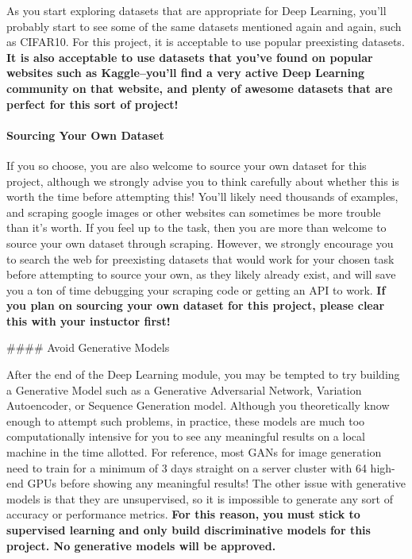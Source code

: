 \documentclass[11pt]{article}
\begin{document}
As you start exploring datasets that are appropriate for Deep Learning,
you'll probably start to see some of the same datasets mentioned again
and again, such as CIFAR10. For this project, it is acceptable to use
popular preexisting datasets. \textbf{It is also acceptable to use
datasets that you've found on popular websites such as Kaggle--you'll
find a very active Deep Learning community on that website, and plenty
of awesome datasets that are perfect for this sort of project!}

\hypertarget{sourcing-your-own-dataset}{%
\paragraph{Sourcing Your Own Dataset}\label{sourcing-your-own-dataset}}

If you so choose, you are also welcome to source your own dataset for
this project, although we strongly advise you to think carefully about
whether this is worth the time before attempting this! You'll likely
need thousands of examples, and scraping google images or other websites
can sometimes be more trouble than it's worth. If you feel up to the
task, then you are more than welcome to source your own dataset through
scraping. However, we strongly encourage you to search the web for
preexisting datasets that would work for your chosen task before
attempting to source your own, as they likely already exist, and will
save you a ton of time debugging your scraping code or getting an API to
work. \textbf{If you plan on sourcing your own dataset for this project,
please clear this with your instuctor first!}

\#\#\#\# Avoid Generative Models

After the end of the Deep Learning module, you may be tempted to try
building a Generative Model such as a Generative Adversarial Network,
Variation Autoencoder, or Sequence Generation model. Although you
theoretically know enough to attempt such problems, in practice, these
models are much too computationally intensive for you to see any
meaningful results on a local machine in the time allotted. For
reference, most GANs for image generation need to train for a minimum of
3 days straight on a server cluster with 64 high-end GPUs before showing
any meaningful results! The other issue with generative models is that
they are unsupervised, so it is impossible to generate any sort of
accuracy or performance metrics. \textbf{For this reason, you must stick
to supervised learning and only build discriminative models for this
project. No generative models will be approved.}
\end{document}
